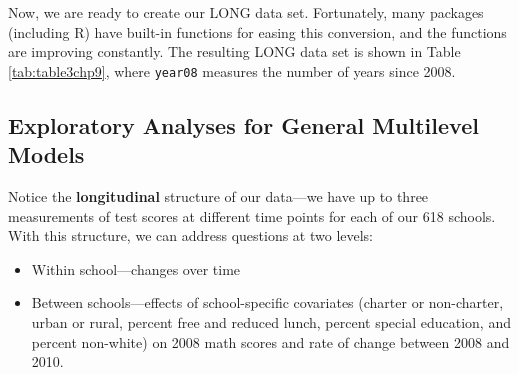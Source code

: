 \documentclass[
]{krantz}
\providecommand{\tightlist}{%
  \setlength{\itemsep}{0pt}\setlength{\parskip}{0pt}}
\begin{document}
Now, we are ready to create our LONG data set. Fortunately, many packages (including R) have built-in functions for easing this conversion, and the functions are improving constantly. The resulting LONG data set is shown in Table \ref{tab:table3chp9}, where \texttt{year08} measures the number of years since 2008.



\begin{table}

\caption{\label{tab:table3chp9}The first six observations in the long data set for the Charter Schools case study; these lines correspond to the first two observations from the wide data set illustrated in Table \ref{tab:table1chp9}.}
\centering
{}
\end{table}

\hypertarget{generalanalyses}{%
\subsection{Exploratory Analyses for General Multilevel Models}\label{generalanalyses}}

Notice the \textbf{longitudinal}  structure of our data---we have up to three measurements of test scores at different time points for each of our 618 schools. With this structure, we can address questions at two levels:

\begin{itemize}
\tightlist
\item
  Within school---changes over time
\item
  Between schools---effects of school-specific covariates (charter or non-charter, urban or rural, percent free and reduced lunch, percent special education, and percent non-white) on 2008 math scores and rate of change between 2008 and 2010.
\end{itemize}
\end{document}
